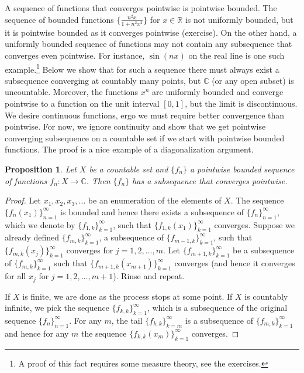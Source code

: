 \documentclass[12pt,openany]{book}
\newcommand{\C}{{\mathbb{C}}}
\newcommand{\R}{{\mathbb{R}}}
\theoremstyle{plain}
\newtheorem{prop}[thm]{Proposition}
\theoremstyle{remark}
\theoremstyle{definition}
\theoremstyle{exercise}
\theoremstyle{example}
\begin{document}
A sequence of functions that converges pointwise is pointwise bounded.
The sequence of bounded functions $\bigl\{ \frac{n^2x}{1+n^2x^2} \bigr\}$
for $x \in \R$
is not uniformly bounded, but it is pointwise bounded as it converges
pointwise (exercise).
On the other hand,
a uniformly bounded sequence of functions may
not contain any subsequence that converges even pointwise.
For instance, $\sin(nx)$ on the real line is one such example.\footnote{%
A proof of this fact requires some measure theory, see the exercises.}
Below we show that for such a sequence there must always exist
a subsequence converging at countably
many points, but $\C$ (or any open subset) is uncountable.
Moreover,
the functions $x^n$ are uniformly bounded
and converge pointwise to a function on the unit interval $[0,1]$, but the limit
is discontinuous.  We desire continuous
functions, ergo we must require better convergence than pointwise.  For now,
we ignore continuity and show that we get pointwise
converging subsequence on a countable set
if we start with pointwise bounded functions.
The proof is a nice example of a diagonalization argument.

\begin{prop} \label{prop:subsequenceoncountableX}
Let $X$ be a countable set and $\{ f_n \}$ a pointwise bounded
sequence of functions $f_n \colon X \to \C$.
Then $\{ f_n \}$ has a subsequence that converges pointwise.
\end{prop}

\begin{proof}
Let $x_1,x_2,x_3,\ldots$ be an enumeration of the elements of $X$.
The sequence $\{ f_n(x_1) \}_{n=1}^\infty$ is bounded and hence
there exists a subsequence of $\{ f_n \}_{n=1}^{\infty}$, which we denote by
$\{ f_{1,k} \}_{k=1}^\infty$,
such that
$\{ f_{1,k}(x_1) \}_{k=1}^\infty$ converges.
Suppose we already defined $\{ f_{m,k} \}_{k=1}^\infty$,
a subsequence of $\{ f_{m-1,k} \}_{k=1}^\infty$,
such that
$\{ f_{m,k}(x_j) \}_{k=1}^\infty$ converges for $j=1,2,\ldots,m$.
Let $\{ f_{m+1,k} \}_{k=1}^\infty$ be a subsequence of
$\{ f_{m,k} \}_{k=1}^\infty$
such that
$\{ f_{m+1,k}(x_{m+1}) \}_{k=1}^\infty$ converges (and hence it converges for all
$x_j$ for $j=1,2,\ldots,m+1$).  Rinse and repeat.

If $X$ is finite, we are done as the process stops at some point.
If $X$ is countably infinite,
we pick the sequence
$\{ f_{k,k} \}_{k=1}^\infty$,
which is a subsequence of the original sequence $\{ f_n \}_{n=1}^\infty$.
For any $m$, the tail $\{ f_{k,k} \}_{k=m}^\infty$ is a subsequence of $\{ f_{m,k}
\}_{k=1}^\infty$
and hence for any $m$ the sequence $\{ f_{k,k}(x_m) \}_{k=1}^\infty$ converges.
\end{proof}
\end{document}
